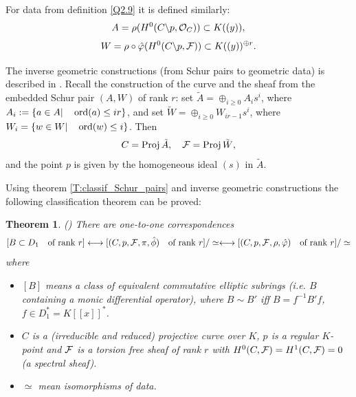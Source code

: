 \documentclass[11pt]{article}
\theoremstyle{definition}
\newcommand{\ord}{\mathop{\rm ord}\nolimits}
\newcommand{\Projj}{\mathop {\rm Proj}}
\theoremstyle{plain}
\newtheorem{theorem}{Theorem}[section]
\numberwithin{equation}{section}
\newcommand{\co}{{{\cal O}}}
\newcommand{\cf}{{{\cal F}}}
\begin{document}
For data from definition \ref{Q2.9} it is defined similarly: 
$$
A = \rho (H^0(C\backslash p,\co_C))\subset K((y)),
$$
$$
W=\rho \circ \hat{\varphi} (H^0(C\backslash p,\cf ))\subset K((y))^{\oplus r}. 
$$

The inverse geometric constructions (from Schur pairs to geometric data) is described in \cite[\S 9]{Zheglov_book}. Recall the construction of the curve and the sheaf from the embedded Schur pair $(A,W)$ of rank $r$: set $\tilde{A}=\oplus_{i\ge 0}A_is^i$, where $A_i:=\{a\in A|\quad \ord (a)\le ir\}$, and set 
$\tilde{W}=\oplus_{i\ge 0}W_{ir-1}s^i$, where $W_i=\{w\in W| \quad \ord (w)\le i\}$. Then
$$
C=\Projj \tilde{A}, \quad \cf =\Projj \tilde{W},
$$
and the point $p$ is given by the homogeneous ideal $(s)$ in $\tilde{A}$. 



Using theorem \ref{T:classif_Schur_pairs} and inverse geometric constructions the following classification theorem can be proved:
\begin{theorem}{(\cite[Th. 10.26]{Zheglov_book})}
\label{T:classif2}
There are  one-to-one correspondences 
$$
[B\subset {D_1}\mbox{\quad of rank $r$}]  \longleftrightarrow  [(C,p,\cf , \pi, \hat{\phi} )\mbox{\quad of rank $r$}]/\simeq \longleftrightarrow  [(C,p,\cf , \rho, \hat{\varphi} )\mbox{\quad of rank $r$}]/\simeq
$$
where 
\begin{itemize}
\item
$[B]$ means a class of equivalent commutative elliptic subrings (i.e. $B$ containing a monic differential operator),  where  $B\sim B'$ iff $B=f^{-1}B'f$, $f\in D_1^*=K[[x]]^*$. 
\item $C$ is a (irreducible and reduced) projective curve over $K$, $p$ is a regular $K$-point and $\cf$ is a torsion free sheaf of rank $r$ with $H^0(C, \cf)=H^1(C,\cf )=0$ (a spectral sheaf). 
\item $\simeq$ mean isomorphisms of data. 
\end{itemize}
\end{theorem}
\end{document}
